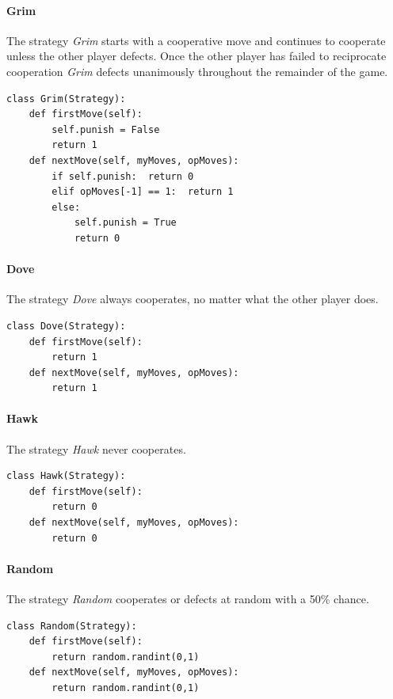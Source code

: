 \paragraph{Grim} The strategy {\em Grim} starts with a cooperative move and
continues to cooperate unless the other player defects. Once the other player
has failed to reciprocate cooperation {\em Grim} defects unanimously throughout
the remainder of the game.
\begin{scriptsize}
\begin{verbatim}
class Grim(Strategy):
    def firstMove(self):
        self.punish = False
        return 1
    def nextMove(self, myMoves, opMoves):
        if self.punish:  return 0
        elif opMoves[-1] == 1:  return 1  
        else:
            self.punish = True
            return 0
\end{verbatim}
\end{scriptsize}

\paragraph{Dove} The strategy {\em Dove} always cooperates, no matter what the
other player does.
\begin{scriptsize}
\begin{verbatim}
class Dove(Strategy):
    def firstMove(self):
        return 1
    def nextMove(self, myMoves, opMoves):
        return 1
\end{verbatim}
\end{scriptsize}

\paragraph{Hawk} The strategy {\em Hawk} never cooperates.
\begin{scriptsize}
\begin{verbatim}
class Hawk(Strategy):
    def firstMove(self):
        return 0
    def nextMove(self, myMoves, opMoves):
        return 0
\end{verbatim}
\end{scriptsize}

\paragraph{Random} The strategy {\em Random} cooperates or defects at random
with a 50\% chance.
\begin{scriptsize}
\begin{verbatim}
class Random(Strategy):
    def firstMove(self):
        return random.randint(0,1)
    def nextMove(self, myMoves, opMoves):
        return random.randint(0,1)
\end{verbatim}
\end{scriptsize}

